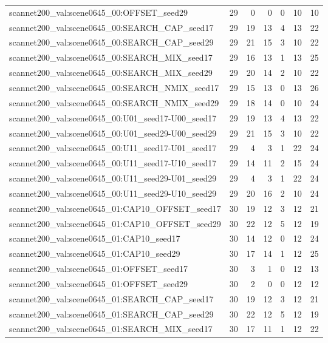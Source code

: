 \begin{table}[t]
\begin{tabular}{lrrrrrr}
scannet200\_val:scene0645\_00:OFFSET\_seed29 & 29 & 0 & 0 & 0 & 10 & 10 \\
scannet200\_val:scene0645\_00:SEARCH\_CAP\_seed17 & 29 & 19 & 13 & 4 & 13 & 22 \\
scannet200\_val:scene0645\_00:SEARCH\_CAP\_seed29 & 29 & 21 & 15 & 3 & 10 & 22 \\
scannet200\_val:scene0645\_00:SEARCH\_MIX\_seed17 & 29 & 16 & 13 & 1 & 13 & 25 \\
scannet200\_val:scene0645\_00:SEARCH\_MIX\_seed29 & 29 & 20 & 14 & 2 & 10 & 22 \\
scannet200\_val:scene0645\_00:SEARCH\_NMIX\_seed17 & 29 & 15 & 13 & 0 & 13 & 26 \\
scannet200\_val:scene0645\_00:SEARCH\_NMIX\_seed29 & 29 & 18 & 14 & 0 & 10 & 24 \\
scannet200\_val:scene0645\_00:U01\_seed17-U00\_seed17 & 29 & 19 & 13 & 4 & 13 & 22 \\
scannet200\_val:scene0645\_00:U01\_seed29-U00\_seed29 & 29 & 21 & 15 & 3 & 10 & 22 \\
scannet200\_val:scene0645\_00:U11\_seed17-U01\_seed17 & 29 & 4 & 3 & 1 & 22 & 24 \\
scannet200\_val:scene0645\_00:U11\_seed17-U10\_seed17 & 29 & 14 & 11 & 2 & 15 & 24 \\
scannet200\_val:scene0645\_00:U11\_seed29-U01\_seed29 & 29 & 4 & 3 & 1 & 22 & 24 \\
scannet200\_val:scene0645\_00:U11\_seed29-U10\_seed29 & 29 & 20 & 16 & 2 & 10 & 24 \\
scannet200\_val:scene0645\_01:CAP10\_OFFSET\_seed17 & 30 & 19 & 12 & 3 & 12 & 21 \\
scannet200\_val:scene0645\_01:CAP10\_OFFSET\_seed29 & 30 & 22 & 12 & 5 & 12 & 19 \\
scannet200\_val:scene0645\_01:CAP10\_seed17 & 30 & 14 & 12 & 0 & 12 & 24 \\
scannet200\_val:scene0645\_01:CAP10\_seed29 & 30 & 17 & 14 & 1 & 12 & 25 \\
scannet200\_val:scene0645\_01:OFFSET\_seed17 & 30 & 3 & 1 & 0 & 12 & 13 \\
scannet200\_val:scene0645\_01:OFFSET\_seed29 & 30 & 2 & 0 & 0 & 12 & 12 \\
scannet200\_val:scene0645\_01:SEARCH\_CAP\_seed17 & 30 & 19 & 12 & 3 & 12 & 21 \\
scannet200\_val:scene0645\_01:SEARCH\_CAP\_seed29 & 30 & 22 & 12 & 5 & 12 & 19 \\
scannet200\_val:scene0645\_01:SEARCH\_MIX\_seed17 & 30 & 17 & 11 & 1 & 12 & 22 \\

\end{tabular}
\end{table}
